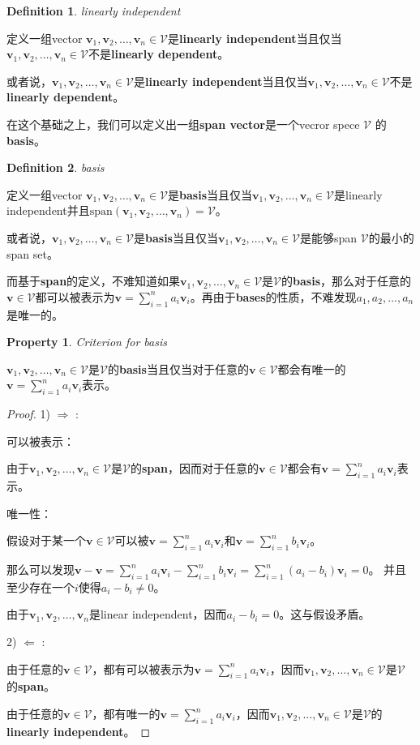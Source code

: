 \documentclass{report}
\def\V{\mathcal{V}}
\def\v{\mathbf{v}}
\def\span{\text{span}}
\newtheorem{definition}{Definition}[chapter]
\newcommand{\deftitle}[1]{\begin{definition}  #1 \end{definition}}
\newtheorem{property}{Property}[chapter]
\newcommand{\proptitle}[1]{\begin{property}  #1 \end{property}}
\newcommand{\defb}[1]{\begin{tcolorbox} [colback=orange!20, colframe=orange!60, sharp corners, leftrule={3pt}, rightrule={0pt}, toprule={0pt}, bottomrule={0pt}, left={2pt}, right={2pt}, top={3pt}, bottom={3pt}] \deftitle{#1}}
\def\defe{\end{tcolorbox}}
\newcommand{\propb}[1]{\begin{tcolorbox} [colback=red!10, colframe=red!60, sharp corners, leftrule={3pt}, rightrule={0pt}, toprule={0pt}, bottomrule={0pt}, left={2pt}, right={2pt}, top={3pt}, bottom={3pt}]\proptitle{#1}}
\def\prope{\end{tcolorbox}}
\begin{document}
\defb{linearly independent}
	定义一组vector $\v_1,\v_2,\dots,\v_n \in \V$是\textbf{linearly independent}当且仅当$\v_1,\v_2,\dots,\v_n \in \V$不是\textbf{linearly dependent}。

	或者说，$\v_1,\v_2,\dots,\v_n \in \V$是\textbf{linearly independent}当且仅当$\v_1,\v_2,\dots,\v_n \in \V$不是\textbf{linearly dependent}。
\defe

在这个基础之上，我们可以定义出一组\textbf{span vector}是一个vecror spece $ \V$ 的\textbf{basis}。

\defb{basis}
	定义一组vector $\v_1,\v_2,\dots,\v_n \in \V$是\textbf{basis}当且仅当$\v_1,\v_2,\dots,\v_n \in \V$是linearly independent并且$\span(\v_1,\v_2,\dots,\v_n) = \V$。

	或者说，$\v_1,\v_2,\dots,\v_n \in \V$是\textbf{basis}当且仅当$\v_1,\v_2,\dots,\v_n \in \V$是能够span $\V$的最小的span set。
\defe

而基于\textbf{span}的定义，不难知道如果$\v_1,\v_2,\dots,\v_n \in \V$是$\V$的\textbf{basis}，那么对于任意的$\v \in \V$都可以被表示为$\v = \sum_{i=1}^{n} a_i \v_i$。再由于\textbf{bases}的性质，不难发现$a_1,a_2,\dots,a_n$是唯一的。

\propb{Criterion for basis}

$\v_1,\v_2,\dots,\v_n \in \V$是$\V$的\textbf{basis}当且仅当对于任意的$\v \in \V$都会有唯一的$\v = \sum_{i=1}^{n} a_i \v_i$表示。

\prope

\begin{proof}

	1) $\Rightarrow$ :

	可以被表示：

	由于$\v_1,\v_2,\dots,\v_n \in \V$是$\V$的\textbf{span}，因而对于任意的$\v \in \V$都会有$\v = \sum_{i=1}^{n} a_i \v_i$表示。
	
	唯一性：

	假设对于某一个$\v \in \V$可以被$\v = \sum_{i=1}^{n} a_i \v_i$和$\v = \sum_{i=1}^{n} b_i \v_i$。
	
	那么可以发现$\v - \v = \sum_{i=1}^{n} a_i \v_i - \sum_{i=1}^{n} b_i \v_i = \sum_{i=1}^{n} (a_i - b_i) \v_i = 0$。 并且至少存在一个$i$使得$a_i - b_i \neq 0$。

	由于$\v_1,\v_2,\dots,\v_n$是linear independent，因而$a_i - b_i = 0$。这与假设矛盾。

	2) $\Leftarrow$ :

	由于任意的$\v \in \V$，都有可以被表示为$\v = \sum_{i=1}^{n} a_i \v_i$，因而$\v_1,\v_2,\dots,\v_n \in \V$是$\V$的\textbf{span}。

	由于任意的$\v \in \V$，都有唯一的$\v = \sum_{i=1}^{n} a_i \v_i$，因而$\v_1,\v_2,\dots,\v_n \in \V$是$\V$的\textbf{linearly independent}。
\end{proof}
\end{document}
